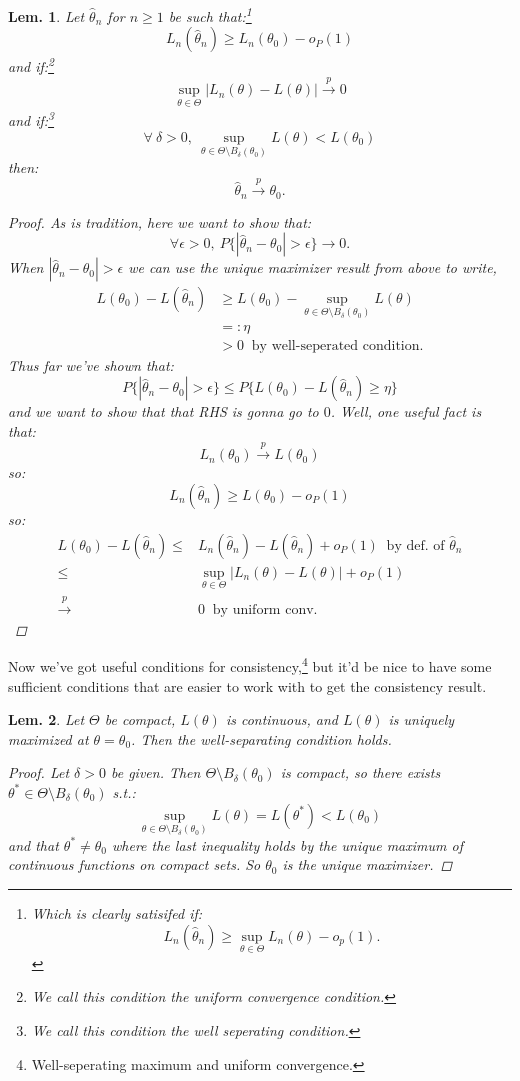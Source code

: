\documentclass{tufte-book}
\theoremstyle{mytheoremstyle}
\theoremstyle{mylemstyle}
\newtheorem*{lem}{Lem.}
\theoremstyle{mydefstyle}
\begin{document}
\begin{lem} Let \(\hat{\theta}_n\) for \(n \ge 1\) be such that:\footnote{Which is clearly satisifed if: \[L_n(\hat{\theta}_n) \ge \sup_{\theta \in \Theta} L_n(\theta) - o_p(1)\text{.}\]}
	\[L_n(\hat{\theta}_n) \ge L_n(\theta_0) - o_P(1)\]
and if:\footnote{We call this condition the uniform convergence condition.} 
	\[\sup_{\theta \in \Theta} |L_n(\theta) - L(\theta) | \overset{p}{\rightarrow} 0\]
and if:\footnote{We call this condition the well seperating condition.} 
	\[\forall\ \delta > 0,\ \sup_{\theta \in \Theta \setminus B_\delta(\theta_0)} L(\theta) < L(\theta_0)\]
then:
	\[\hat{\theta}_n \overset{p}{\rightarrow} \theta_0 \text{.}\]
\begin{proof} As is tradition, here we want to show that:
	\[\forall \epsilon > 0,\ P\{|\hat{\theta}_n - \theta_0| > \epsilon\} \rightarrow 0 \text{.}\]
When \(|\hat{\theta}_n - \theta_0| > \epsilon\) we can use the unique maximizer result from above to write,
	\begin{align*}
		L(\theta_0) - L(\hat{\theta}_n) & \ge L(\theta_0) - \sup_{\theta \in \Theta \setminus B_\delta(\theta_0)} L(\theta) \\
								& =: \eta \\
								& > 0\ \text{ by well-seperated condition.}
	\end{align*}
Thus far we've shown that:
	\[P\{|\hat{\theta}_n - \theta_0| > \epsilon\} \le P\{L(\theta_0) - L(\hat{\theta}_n) \ge \eta\}\]
and we want to show that that RHS is gonna go to \(0\). Well, one useful fact is that:
	\[L_n(\theta_0) \overset{p}{\rightarrow} L(\theta_0)\]
so:
	\[L_n(\hat{\theta}_n) \ge L(\theta_0) - o_P(1)\]
so:
	\begin{align*}
		L(\theta_0) - L(\hat{\theta}_n) \le & L_n(\hat{\theta}_n) - L(\hat{\theta}_n) + o_P(1)\ \text{ by def. of } \hat{\theta}_n \\
								\le & \sup_{\theta \in \Theta} |L_n(\theta) - L(\theta)| + o_P(1) \\
								\overset{p}{\rightarrow} & 0\ \text{ by uniform conv.}
	\end{align*}

\end{proof}
\end{lem}
\noindent Now we've got useful conditions for consistency,\footnote{Well-seperating maximum and uniform convergence.} but it'd be nice to have some sufficient conditions that are easier to work with to get the consistency result.
\begin{lem} Let \(\Theta\) be compact, \(L(\theta)\) is continuous, and \(L(\theta)\) is uniquely maximized at \(\theta = \theta_0\). Then the well-separating condition holds.
\begin{proof} Let \(\delta > 0\) be given. Then \(\Theta \setminus B_\delta(\theta_0)\) is compact, so there exists \(\theta^* \in \Theta \setminus B_\delta(\theta_0)\) s.t.:
	\[\sup_{\theta \in \Theta \setminus B_\delta(\theta_0)} L(\theta) = L(\theta^*) < L(\theta_0)\]
and that \(\theta^*\ne \theta_0\) where the last inequality holds by the unique maximum of continuous functions on compact sets. So \(\theta_0\) is the unique maximizer. 
\end{proof}
\end{lem}
\end{document}

